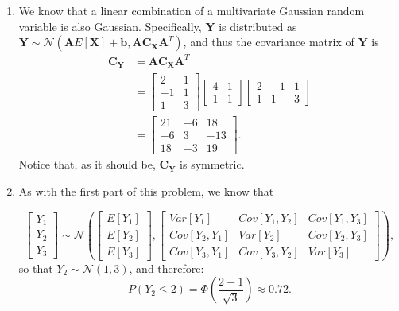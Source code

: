 \begin{problem}{15}
\begin{enumerate}
\item  We know that a linear combination of a multivariate Gaussian random variable is also Gaussian.  Specifically, $\bm Y$ is distributed as $\bm Y\sim \mathcal N(\bm A E[\bm X] +\bm b, \bm A \bm{C_X} \bm A^T)$, and thus the covariance matrix of $\bm Y$ is
\begin{align*}
\bm{C_Y}& =  \bm A \bm{C_X} \bm A^T \\
&=\left[\begin{matrix}
    2 & 1 \\
    -1 & 1 \\
    1 & 3  
\end{matrix}\right] \left[\begin{matrix}
    4 & 1 \\
    1 & 1
\end{matrix}\right] \left[\begin{matrix}
    2 & -1 &1 \\
    1 & 1 & 3 
\end{matrix}\right] \\
& = \left[\begin{matrix}
    21& -6 &18 \\
    -6& 3 & -13 \\
    18& -3 &19 
\end{matrix}\right].
\end{align*}
Notice that, as it should be, $\bm{C_Y}$ is symmetric.

\item As with the first part of this problem, we know that

\begin{equation*}
\begin{bmatrix} Y_1 \\Y_2 \\Y_3 \end{bmatrix} \sim \mathcal N \left(\begin{bmatrix} E[Y_1] \\ E[Y_2]  \\ E[Y_3] \end{bmatrix},   \left[\begin{matrix}
    Var[Y_1] & Cov[Y_1, Y_2] & Cov[Y_1, Y_3] \\
    Cov[Y_2, Y_1] & Var[Y_2] & Cov[Y_2, Y_3] \\
    Cov[Y_3, Y_1] & Cov[Y_3, Y_2] & Var[Y_3]
\end{matrix}\right] \right),
\end{equation*}
so that $Y_2 \sim \mathcal N(1, 3)$, and therefore:
\begin{equation*}
P(Y_2 \le 2) = \Phi \left(\frac{2-1}{\sqrt{3}} \right) \approx 0.72.
\end{equation*}

\end{enumerate}

\end{problem}

